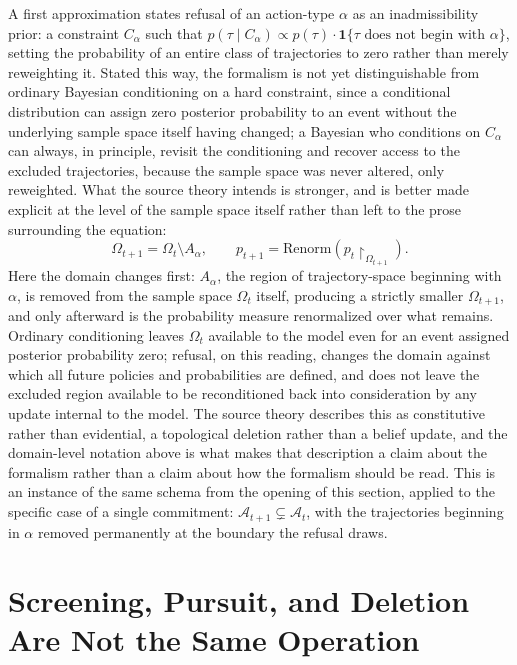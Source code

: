 \documentclass[11pt]{article}
\theoremstyle{plain}
\begin{document}
A first approximation states refusal of an action-type $\alpha$ as an inadmissibility prior: a constraint $C_\alpha$ such that $p(\tau \mid C_\alpha) \propto p(\tau)\cdot \mathbf{1}\{\tau \text{ does not begin with } \alpha\}$, setting the probability of an entire class of trajectories to zero rather than merely reweighting it. Stated this way, the formalism is not yet distinguishable from ordinary Bayesian conditioning on a hard constraint, since a conditional distribution can assign zero posterior probability to an event without the underlying sample space itself having changed; a Bayesian who conditions on $C_\alpha$ can always, in principle, revisit the conditioning and recover access to the excluded trajectories, because the sample space was never altered, only reweighted. What the source theory intends is stronger, and is better made explicit at the level of the sample space itself rather than left to the prose surrounding the equation:
\[
\Omega_{t+1} = \Omega_t \setminus A_\alpha, \qquad p_{t+1} = \mathrm{Renorm}\left(p_t \restriction_{\Omega_{t+1}}\right).
\]
Here the domain changes first: $A_\alpha$, the region of trajectory-space beginning with $\alpha$, is removed from the sample space $\Omega_t$ itself, producing a strictly smaller $\Omega_{t+1}$, and only afterward is the probability measure renormalized over what remains. Ordinary conditioning leaves $\Omega_t$ available to the model even for an event assigned posterior probability zero; refusal, on this reading, changes the domain against which all future policies and probabilities are defined, and does not leave the excluded region available to be reconditioned back into consideration by any update internal to the model. The source theory describes this as constitutive rather than evidential, a topological deletion rather than a belief update, and the domain-level notation above is what makes that description a claim about the formalism rather than a claim about how the formalism should be read. This is an instance of the same schema from the opening of this section, applied to the specific case of a single commitment: $\mathcal{A}_{t+1} \subsetneq \mathcal{A}_t$, with the trajectories beginning in $\alpha$ removed permanently at the boundary the refusal draws.

\section{Screening, Pursuit, and Deletion Are Not the Same Operation}
\label{sec:three}
\end{document}
